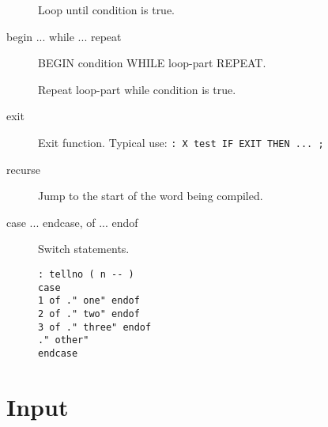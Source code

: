 \begin{description}
Loop until condition is true.

\item[begin ... while ... repeat]

BEGIN condition WHILE loop-part REPEAT.

Repeat loop-part while condition is true.

\item[exit]

Exit function. Typical use: \texttt{: X test IF EXIT THEN ... ;}

\item[recurse] Jump to the start of the word being compiled.

\item[case ... endcase, of ... endof] Switch statements.

\begin{verbatim}
: tellno ( n -- )
case
1 of ." one" endof
2 of ." two" endof
3 of ." three" endof
." other"
endcase
\end{verbatim}

\end{description}

\section{Input}

